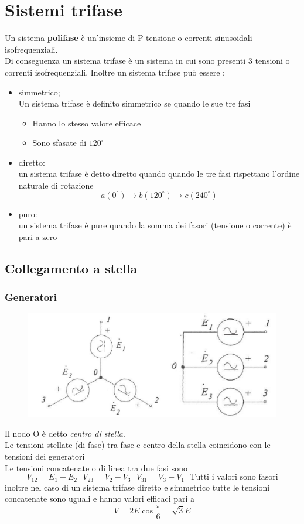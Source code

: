 \documentclass{article}
\theoremstyle{definition}
\begin{document}
\section{Sistemi trifase}
Un sistema \textbf{polifase} è un'insieme di P tensione o correnti sinusoidali isofrequenziali. \\ Di conseguenza un sistema trifase è un sistema in cui sono presenti 3 tensioni o correnti isofrequenziali.
Inoltre un sistema trifase può essere :
\begin{itemize}
\item simmetrico;\\
Un sistema trifase è definito simmetrico se quando le sue tre fasi 
\begin{itemize}
	\item Hanno lo stesso valore efficace 
	\item Sono sfasate di $120^\circ$
\end{itemize}
\item diretto:\\
un sistema trifase è detto diretto quando quando le tre fasi rispettano l'ordine naturale di rotazione 
$$a(0^\circ)\rightarrow b (120^\circ)\rightarrow c(240^\circ)$$
\item puro:\\
un sistema trifase è pure quando la somma dei fasori (tensione o corrente) è pari a zero
\end{itemize}
\subsection{Collegamento a stella}
\subsubsection{Generatori}
\begin{figure}[h]
	\centering
	\includegraphics[scale=0.50]{immagini/stella}
	\label{fig:stella}
\end{figure}
Il nodo O è detto \textit{centro di stella}.\\Le tensioni stellate (di fase) tra fase e centro della stella coincidono con le tensioni dei generatori\\Le tensioni concatenate o di linea tra due fasi sono 
$$V_{12}=E_1-E_2 \ \ \ V_{23}=V_2-V_3 \ \ \ V_{31}=V_3-V_1 \ \ \ \text{Tutti i valori sono fasori}$$
inoltre nel caso di un sistema trifase diretto e simmetrico tutte le tensioni concatenate sono uguali e hanno valori efficaci pari a $$V=2E\cos{\frac{\pi}{6}}=\sqrt{3}E$$
\end{document}
